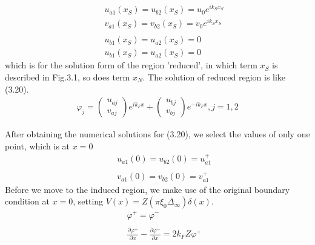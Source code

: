 \begin{eqnarray}
&&u_{a1}(x_S)=u_{b2}(x_S)=u_0 e^{ik_Sx_S}\nonumber\\
&&v_{a1}(x_S)=v_{b2}(x_S)=v_0 e^{ik_Sx_S}\nonumber\\
&&\\
&&u_{b1}(x_S)=u_{a2}(x_S)=0\nonumber\\
&&u_{b1}(x_S)=u_{a2}(x_S)=0\nonumber
\end{eqnarray}
which is for the solution form of the region 'reduced', in which term $x_S$ is described in Fig.3.1, so does term $x_N$. The solution of reduced region is like (3.20).
\begin{eqnarray}
\varphi_j=
\left(
\begin{array}{c}
 u_{aj}\\
 v_{aj}
 \end{array}\right)e^{ik_Fx}+
 \left(
\begin{array}{c}
 u_{bj}\\
 v_{bj}
 \end{array}\right)e^{-i k_Fx},j=1,2
\end{eqnarray}

After obtaining the numerical solutions for (3.20), we select the values of only one point, which is at $x=0$
\begin{eqnarray}
&&u_{a1}(0)=u_{b2}(0)=u_{a1}^+\nonumber\\
\\
&&v_{a1}(0)=v_{b2}(0)=v_{a1}^+\nonumber
\end{eqnarray}
Before we move to the induced region, we make use of the original boundary condition at $x=0$, setting $V(x)=Z(\pi\xi_0\Delta_{\infty})\delta(x)$.
\begin{eqnarray}
&&\varphi^+=\varphi^-\nonumber\\
\\
&&\frac{\partial \varphi^+}{\partial x}-\frac{\partial \varphi^-}{\partial x}=2k_FZ\varphi^+\nonumber
\end{eqnarray}


